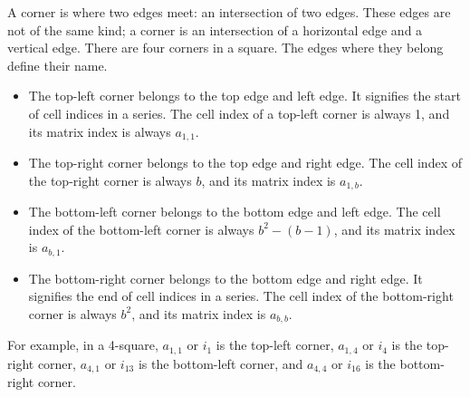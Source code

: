 \documentclass[letterpaper, twoside,12pt]{article}
\begin{document}
    A corner is where two edges meet: an intersection of two edges. These edges are not of the same kind; a corner is an intersection of a horizontal edge and a vertical edge. There are four corners in a square. The edges where they belong define their name.
    \begin{itemize}
        \item The top-left corner belongs to the top edge and left edge. It signifies the start of cell indices in a series. The cell index of a top-left corner is always 1, and its matrix index is always $a_{1,1}$.
        \item The top-right corner belongs to the top edge and right edge. The cell index of the top-right corner is always $b$, and its matrix index is $a_{1,b}$.
        \item The bottom-left corner belongs to the bottom edge and left edge. The cell index of the bottom-left corner is always $b^2 - (b - 1)$, and its matrix index is $a_{b,1}$.
        \item The bottom-right corner belongs to the bottom edge and right edge. It signifies the end of cell indices in a series. The cell index of the bottom-right corner is always $b^2$, and its matrix index is $a_{b,b}$.
    \end{itemize}

    For example, in a 4-square, $a_{1,1}$ or $i_1$ is the top-left corner, $a_{1,4}$ or $i_4$ is the top-right corner, $a_{4,1}$ or $i_{13}$ is the bottom-left corner, and $a_{4,4}$ or $i_{16}$ is the bottom-right corner.

    \newpage
\end{document}
